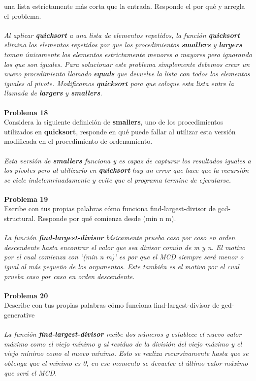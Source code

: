 \documentclass[14pt]{article}
\begin{document}
	una lista estrictamente más corta que la entrada. Responde el por qué y arregla el problema.
	\\
	\\\textit{Al aplicar \textbf{quicksort} a una lista de elementos repetidos, la función \textbf{quicksort} elimina los elementos repetidos por que los procedimientos \textbf{smallers} y \textbf{largers} toman únicamente los elementos estrictamente menores o mayores pero ignorando los que son iguales. Para solucionar este problema simplemente debemos crear un nuevo procedimiento llamado \textbf{equals} que devuelve la lista con todos los elementos iguales al pivote. Modificamos \textbf{quicksort} para que coloque esta lista entre la llamada de \textbf{largers} y \textbf{smallers}.}
	\\
	\\{\large\textbf{Problema 18}}
	\\ Considera la siguiente definición de \textbf{smallers}, uno de los procedimientos utilizados en \textbf{quicksort}, responde en qué puede fallar al utilizar esta versión modificada en el procedimiento de ordenamiento.
	\\
	\\\textit{Esta versión de \textbf{smallers} funciona y es capaz de capturar los resultados iguales a los pivotes pero al utilizarlo en \textbf{quicksort} hay un error que hace que la recursión se cicle indetemrinadamente y evite que el programa termine de ejecutarse.}
	\\
	\\{\large\textbf{Problema 19}}
	\\Escribe con tus propias palabras cómo funciona find-largest-divisor de gcd-structural. Responde por qué comienza desde (min n m).
	\\
	\\\textit{La función \textbf{find-largest-divisor} básicamente prueba caso por caso en orden descendente hasta encontrar	el valor que sea divisor común de m y n. El motivo por el cual comienza con '(min n m)' es por que el MCD siempre será menor o igual al más pequeño de los argumentos. Este también es el motivo por el cual prueba caso por caso en orden descendente.}
	\\
	\\{\large\textbf{Problema 20}}
	\\Describe con tus propias palabras cómo funciona find-largest-divisor de gcd-generative
	\\
	\\\textit{La función \textbf{find-largest-divisor} recibe dos números y establece el nuevo valor máximo como el viejo mínimo y al residuo de la división del viejo máximo y el viejo mínimo como el nuevo mínimo. Esto se realiza recursivamente hasta que se obtenga que el mínimo es 0, en ese momento se devuelve el último valor máximo que será el MCD.}
\end{document}
